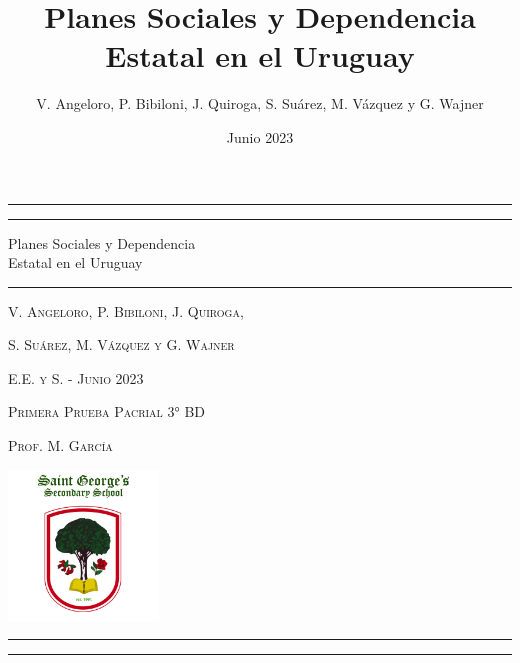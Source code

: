 \documentclass{article}
\title{Planes Sociales y Dependencia Estatal en el Uruguay
}
\author{V. Angeloro, P. Bibiloni, J. Quiroga, S. Suárez, M. Vázquez y G. Wajner}
\date{Junio 2023}
\begin{document}
\begin{titlepage}
	
	\centering
	
	\rule{\textwidth}{1pt}
	\vspace{2pt}\vspace{-\baselineskip}
	\rule{\textwidth}{0.4pt}

	\vspace{0.1\textheight}
	
	{\Huge Planes Sociales y Dependencia}\\[0.5\baselineskip]
	{\Huge Estatal en el Uruguay}
	
	\vspace{0.025\textheight}
	
	\rule{0.3\textwidth}{0.4pt}
	
	\vspace{0.037\textheight}
	{\Large \textsc{V. Angeloro, P. Bibiloni, J. Quiroga,}}

  \vspace{0.1cm}

  {\Large \textsc{S. Suárez, M. Vázquez y G. Wajner}}

  \vfill
	
  \large\textsc{E.E. y S. - Junio 2023}

  \vspace{-0.2cm}

  \large\textsc{Primera Prueba Pacrial 3° BD}

  \vspace{-0.2cm}

  \large\textsc{Prof. M. García}

  \vspace{0.05\textheight}

	\includegraphics[width=0.3\textwidth]{logo.jpg}
	
  \vspace{0.08\textheight}

	\rule{\textwidth}{0.4pt}
	
	\vspace{2pt}\vspace{-\baselineskip}
	
	\rule{\textwidth}{1pt}
	
\end{titlepage}
\end{document}
